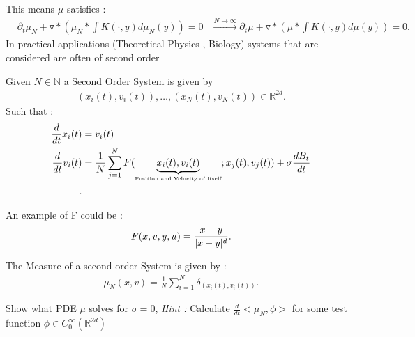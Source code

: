 This means $\mu $ satisfies : 
\begin{align*}
  &\partial_t \mu_N + \triangledown * (\mu_N * \int K(\cdot,y)d \mu_N(y)) = 0
  &\xrightarrow{N\to \infty} \partial_t \mu + \triangledown * (\mu * \int K(\cdot,y)d \mu(y)) = 0
.\end{align*}
In practical applications (Theoretical Physics , Biology) systems that are considered are often of second order
\begin{definition}
  Given $N \in  \mathbb{N} $ a Second Order System is given by 
  \begin{align*}
    (x_i(t),v_i(t)),\ldots ,(x_{N}(t),v_{N}(t)) \in  \mathbb{R}^{2d } 
  .\end{align*}
  Such that : 
  \begin{align*}
    \frac{d}{dt} x_i(t) &= v_i(t)  \\
    \frac{d}{dt} v_i(t) &= \frac{1}{N} \sum_{j=1}^{N} F(\underbrace{x_i(t),v_i(t)}_{\text{\tiny Position and Velocity of itself}} ; x_{j}(t),v_j(t))  + \sigma \frac{d B_t}{dt}\\ 
  .\end{align*}
\end{definition}
\begin{example}
  An example of F could be : 
  \begin{align*}
    F(x,v,y,u) = \frac{x-y}{\lvert x-y\rvert^{d} }
  .\end{align*}
\end{example}
\begin{definition}
 The Measure of a second order System is given by : 
 \begin{align*}
   \mu_{N}(x,v) = \frac{1}{N} \sum_{i=1}^{N} \delta_{(x_{i}(t),v_i(t))} 
 .\end{align*}
\end{definition}
\begin{exercise}
  Show what PDE $\mu $ solves for $\sigma = 0$, \textit{Hint :} Calculate  $\frac{d}{dt} <\mu_N,\phi> $ for some test function $\phi  \in C_{0}^{\infty}(\mathbb{R}^{2d} ) $
\end{exercise}
